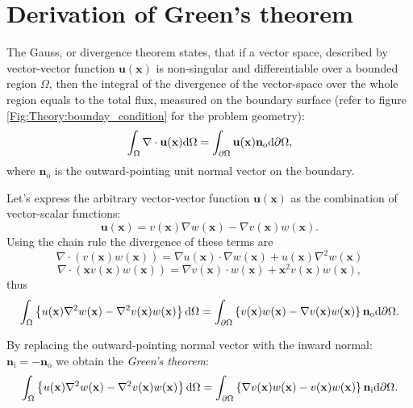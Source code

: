 \section{Derivation of Green's theorem}

The Gauss, or divergence theorem states, that if a vector space, described by vector-vector function $\mathbf{u}(\mathbf{x})$ is non-singular and differentiable over a bounded region $\Omega$, then the integral of the divergence of the vector-space over the whole region equals to the total flux, measured on the boundary surface (refer to figure \ref{Fig:Theory:bounday_condition} for the problem geometry):
\begin{equation}
\int_{\Omega} \nabla \cdot \mathbf{u}(\mathbf{x}) \mathrm{d} \Omega = \int_{\partial \Omega} \mathbf{u}(\mathbf{x}) \mathbf{n}_{\mathrm{o}} \mathrm{d} \partial\Omega,
\end{equation}
where $\mathbf{n}_{\mathrm{o}} $ is the outward-pointing unit normal vector on the boundary.

Let's express the arbitrary vector-vector function $\mathbf{u}(\mathbf{x})$ as the combination of vector-scalar functions:
\begin{equation}
\mathbf{u}(\mathbf{x}) = v(\mathbf{x})\nabla w(\mathbf{x}) - \nabla v(\mathbf{x}) w(\mathbf{x}).
\end{equation}
Using the chain rule the divergence of these terms are
\begin{equation}
\nabla \cdot ( v(\mathbf{x}) w(\mathbf{x}) ) = \nabla u(\mathbf{x})\cdot \nabla w(\mathbf{x}) + u(\mathbf{x}) \nabla^2 w(\mathbf{x})
\end{equation}
\begin{equation}
\nabla \cdot( \mathbf{x} v(\mathbf{x}) w(\mathbf{x}) ) = \nabla v(\mathbf{x}) \cdot w(\mathbf{x}) + \mathbf{x}^2 v(\mathbf{x}) w(\mathbf{x}),
\end{equation}
thus
\begin{equation}
\int_{\Omega} \left\{ u(\mathbf{x}) \nabla^2w(\mathbf{x}) - \nabla^2 v(\mathbf{x}) w(\mathbf{x}) \right\} \mathrm{d} \Omega = \int_{\partial \Omega}
\left\{ v(\mathbf{x})w(\mathbf{x}) - \nabla v(\mathbf{x}) w(\mathbf{x})  \right\} \mathbf{n}_{\mathrm{o}}
 \mathrm{d} \partial\Omega.
\end{equation}

By replacing the outward-pointing normal vector with the inward normal: $\mathbf{n}_{\mathrm{i}} = -\mathbf{n}_{\mathrm{o}}$ we obtain the  \emph{Green's theorem}:
\begin{equation}
\int_{\Omega} \left\{ u(\mathbf{x}) \nabla^2w(\mathbf{x}) - \nabla^2 v(\mathbf{x}) w(\mathbf{x}) \right\} \mathrm{d} \Omega = \int_{\partial \Omega}
\left\{  \nabla v(\mathbf{x}) w(\mathbf{x})  - v(\mathbf{x})w(\mathbf{x})  \right\} \mathbf{n}_{\mathrm{i}}
 \mathrm{d} \partial\Omega.
\label{Eq:App:Green_theorem}
\end{equation}